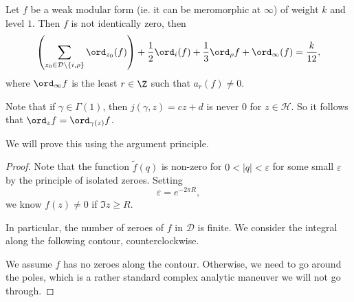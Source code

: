\documentclass[a4paper]{article}
\renewcommand{\H}{\mathcal{H}}
\begin{document}
\begin{prop}
  Let $f$ be a weak modular form (ie. it can be meromorphic at $\infty$) of weight $k$ and level $1$. Then $f$ is not identically zero, then
  \[
    \left(\sum_{z_0 \in \mathcal{D} \setminus \{i, \rho\}} \ord_{z_0} (f)\right) + \frac{1}{2} \ord_i(f) + \frac{1}{3} \ord_\rho f + \ord_\infty(f) = \frac{k}{12},
  \]
  where $\ord_\infty f$ is the least $r \in \Z$ such that $a_r(f) \not= 0$.
\end{prop}
Note that if $\gamma \in \Gamma(1)$, then $j(\gamma, z) = cz + d$ is never $0$ for $z \in \H$. So it follows that $\ord_z f = \ord_{\gamma(z)} f$.

We will prove this using the argument principle.
\begin{proof}
  Note that the function $\tilde{f}(q)$ is non-zero for $0 < |q| < \varepsilon$ for some small $\varepsilon$ by the principle of isolated zeroes. Setting
  \[
    \varepsilon = e^{-2\pi R},
  \]
  we know $f(z) \not= 0$ if $\Im z \geq R$.

  In particular, the number of zeroes of $f$ in $\mathcal{D}$ is finite. We consider the integral along the following contour, counterclockwise.
  \begin{center}
  \end{center}
  We assume $f$ has no zeroes along the contour. Otherwise, we need to go around the poles, which is a rather standard complex analytic maneuver we will not go through.


\end{proof}
\end{document}

